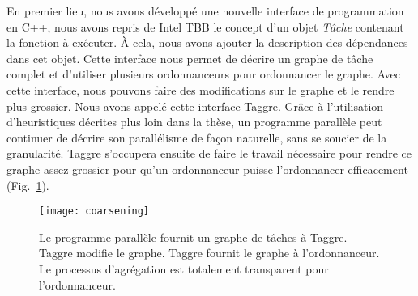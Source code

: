 En premier lieu, nous avons développé une nouvelle interface de programmation en C++, nous avons repris de Intel TBB le concept d'un objet {\em Tâche} contenant la fonction à exécuter.
%
\`A cela, nous avons ajouter la description des dépendances dans cet objet.
%
Cette interface nous permet de décrire un graphe de tâche complet et d'utiliser plusieurs ordonnanceurs pour ordonnancer le graphe.
%
Avec cette interface, nous pouvons faire des modifications sur le graphe et le rendre plus grossier.
%
Nous avons appelé cette interface Taggre.
%
Grâce à l'utilisation d'heuristiques décrites plus loin dans la thèse, un programme parallèle peut continuer de décrire son parallélisme de façon naturelle, sans se soucier de la granularité.
%
Taggre s'occupera ensuite de faire le travail nécessaire pour rendre ce graphe assez grossier pour qu'un ordonnanceur puisse l'ordonnancer efficacement (Fig.~\ref{fig:coarsening}).

\begin{figure}[t!]
  \centering
  \texttt{[image: coarsening]}
  \caption{Le programme parallèle fournit un graphe de tâches à Taggre. Taggre modifie le graphe. Taggre fournit le graphe à l'ordonnanceur. Le processus d'agrégation est totalement transparent pour l'ordonnanceur.}
  \label{fig:coarsening}
\end{figure}



